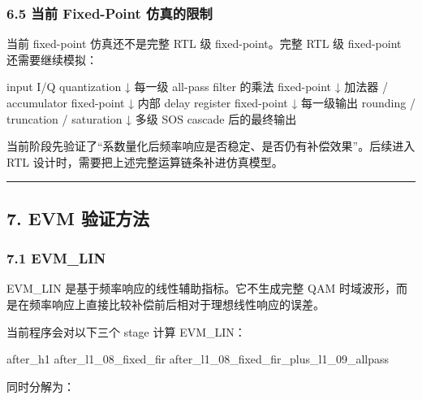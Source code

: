 \documentclass[
]{ctexart}
\newenvironment{Shaded}{}{}
\newcommand{\NormalTok}[1]{#1}
\begin{document}
\subsubsection{6.5 当前 Fixed-Point
仿真的限制}\label{ux5f53ux524d-fixed-point-ux4effux771fux7684ux9650ux5236}

当前 fixed-point 仿真还不是完整 RTL 级 fixed-point。完整 RTL 级
fixed-point 还需要继续模拟：

\begin{Shaded}
\begin{Highlighting}[]
\NormalTok{input I/Q quantization}
\NormalTok{    ↓}
\NormalTok{每一级 all{-}pass filter 的乘法 fixed{-}point}
\NormalTok{    ↓}
\NormalTok{加法器 / accumulator fixed{-}point}
\NormalTok{    ↓}
\NormalTok{内部 delay register fixed{-}point}
\NormalTok{    ↓}
\NormalTok{每一级输出 rounding / truncation / saturation}
\NormalTok{    ↓}
\NormalTok{多级 SOS cascade 后的最终输出}
\end{Highlighting}
\end{Shaded}

当前阶段先验证了``系数量化后频率响应是否稳定、是否仍有补偿效果''。后续进入
RTL 设计时，需要把上述完整运算链条补进仿真模型。

\begin{center}\rule{0.5\linewidth}{0.5pt}\end{center}

\subsection{7. EVM 验证方法}\label{evm-ux9a8cux8bc1ux65b9ux6cd5}

\subsubsection{7.1 EVM\_LIN}\label{evm_lin}

EVM\_LIN 是基于频率响应的线性辅助指标。它不生成完整 QAM
时域波形，而是在频率响应上直接比较补偿前后相对于理想线性响应的误差。

当前程序会对以下三个 stage 计算 EVM\_LIN：

\begin{Shaded}
\begin{Highlighting}[]
\NormalTok{after\_h1}
\NormalTok{after\_l1\_08\_fixed\_fir}
\NormalTok{after\_l1\_08\_fixed\_fir\_plus\_l1\_09\_allpass}
\end{Highlighting}
\end{Shaded}

同时分解为：
\end{document}
